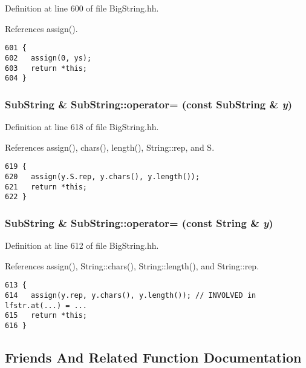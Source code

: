Definition at line 600 of file Big\-String.hh.

References assign().



\footnotesize\begin{verbatim}601 {
602   assign(0, ys);
603   return *this;
604 }
\end{verbatim}\normalsize 
{}
\subsubsection{\setlength{\rightskip}{0pt plus 5cm}Sub\-String \& Sub\-String::operator= (const Sub\-String \& {\em y})\hspace{0.3cm}{\tt  [inline]}}\label{classSubString_a2}




Definition at line 618 of file Big\-String.hh.

References assign(), chars(), length(), String::rep, and S.



\footnotesize\begin{verbatim}619 {
620   assign(y.S.rep, y.chars(), y.length());
621   return *this;
622 }
\end{verbatim}\normalsize 
{}
\subsubsection{\setlength{\rightskip}{0pt plus 5cm}Sub\-String \& Sub\-String::operator= (const {\bf String} \& {\em y})\hspace{0.3cm}{\tt  [inline]}}\label{classSubString_a1}




Definition at line 612 of file Big\-String.hh.

References assign(), String::chars(), String::length(), and String::rep.



\footnotesize\begin{verbatim}613 {
614   assign(y.rep, y.chars(), y.length()); // INVOLVED in lfstr.at(...) = ...
615   return *this;
616 }
\end{verbatim}\normalsize 


\subsection{Friends And Related Function Documentation}
